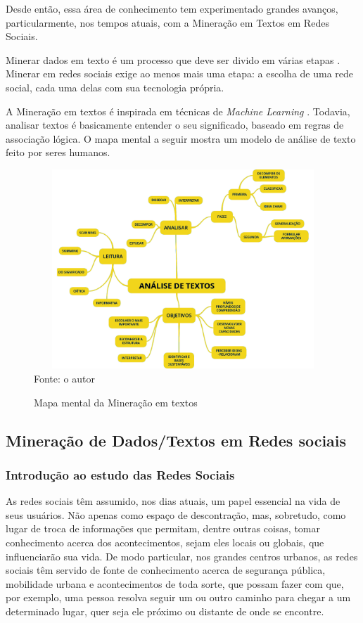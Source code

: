 Desde então, essa área de conhecimento tem experimentado grandes avanços, particularmente, nos tempos atuais, com a Mineração em Textos em Redes Sociais.

Minerar dados em texto é um processo que deve ser divido em várias etapas \cite{Lima2012}. Minerar em redes sociais exige ao menos mais uma etapa: a escolha de uma rede social, cada uma delas com sua tecnologia própria.

A Mineração em textos é inspirada em técnicas de \textit{Machine Learning} \cite{Aranha2006}. Todavia, analisar textos é basicamente entender o seu significado, baseado em regras de associação lógica. O mapa mental a seguir mostra um modelo de análise de texto feito por seres humanos.

\begin{figure}[htpb]
	\centering
	\caption{Mapa mental da Mineração em textos}
	\includegraphics[width=139mm, height=75mm]{Figuras/BigData/Analise_Textos2.png}
	\tiny Fonte: o autor
\end{figure}


\subsection{Mineração de Dados/Textos em Redes sociais}

\subsubsection{Introdução ao estudo das Redes Sociais}

As redes sociais têm assumido, nos dias atuais, um papel essencial na vida de seus usuários. Não apenas como espaço de descontração, mas, sobretudo, como lugar de troca de informações que permitam, dentre outras coisas, tomar conhecimento acerca dos acontecimentos, sejam eles locais ou globais, que influenciarão sua vida. De modo particular, nos grandes centros urbanos, as redes sociais têm servido de fonte de conhecimento acerca de segurança pública, mobilidade urbana e acontecimentos de toda sorte, que possam fazer com que, por exemplo, uma pessoa resolva seguir um ou outro caminho para chegar a um determinado lugar, quer seja ele próximo ou distante de onde se encontre.

